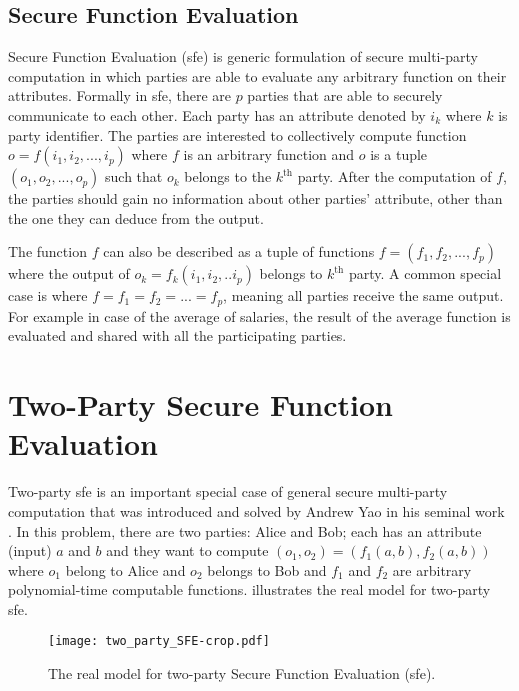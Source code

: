 \subsection{Secure Function Evaluation}\label{ssec:prelim-sfe}
Secure Function Evaluation (\acrshort{sfe}) is generic formulation of secure multi-party computation in which parties are able to evaluate any arbitrary function on their attributes.
Formally in \acrshort{sfe}, there are $p$ parties that are able to securely communicate to each other.
Each party has an attribute denoted by $i_k$ where $k$ is party identifier.
The parties are interested to collectively compute function $o = f(i_1, i_2, ..., i_p)$ where $f$ is an arbitrary function and $o$ is a tuple $(o_1, o_2, ..., o_p)$ such that $o_k$ belongs to the $k^{\text{th}}$ party.
After the computation of $f$, the parties should gain no information about other parties' attribute, other than the one they can deduce from the output.

The function $f$ can also be described as a tuple of functions $f = (f_1, f_2, ...,  f_p)$ where the output of $o_k = f_k(i_1, i_2, .. i_p)$ belongs to $k^{\text{th}}$ party.
A common special case is where $f = f_1 = f_2 = ... = f_p$, meaning all parties receive the same output.
For example in case of the average of salaries, the result of the average function is evaluated and shared with all the participating parties.

\section{Two-Party Secure Function Evaluation}\label{sec:prelim-2sfe}
Two-party \acrshort{sfe} is an important special case of general secure multi-party computation that was introduced and solved by Andrew Yao in his seminal work \cite{yao1986generate}.
In this problem, there are two parties: Alice and Bob; each has an attribute (input) $a$ and $b$ and they want to compute $(o_1, o_2) = (f_1(a, b), f_2(a, b))$ where $o_1$ belong to Alice and $o_2$ belongs to Bob and $f_1$ and $f_2$ are arbitrary polynomial-time computable functions.
 illustrates the real model for two-party \acrshort{sfe}.

\begin{figure}
\centering
\texttt{[image: two\_party\_SFE-crop.pdf]}
\caption{The real model for two-party Secure Function Evaluation (\acrshort{sfe}).}
\label{fig:two-party-sfe}
\end{figure}

